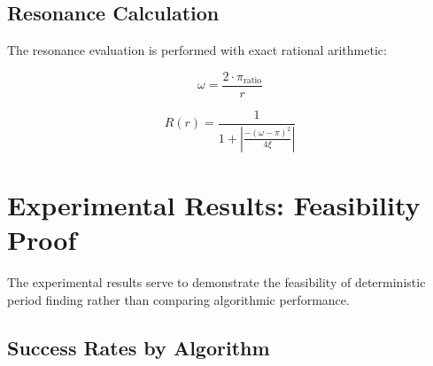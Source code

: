 	\begin{table}[H]
		\centering
		\caption{$\xi$-Strategies in the T0-Framework}
		\label{tab:xi_strategies}
	\end{table}
	
	\subsection{Resonance Calculation}
	
	The resonance evaluation is performed with exact rational arithmetic:
	
	\begin{equation}
		\omega = \frac{2 \cdot \pi_{\text{ratio}}}{r}
	\end{equation}
	
	\begin{equation}
		R(r) = \frac{1}{1 + \left|\frac{-(\omega-\pi)^2}{4\xi}\right|}
	\end{equation}
	
	\section{Experimental Results: Feasibility Proof}
	
	The experimental results serve to demonstrate the feasibility of deterministic period finding rather than comparing algorithmic performance.
	
	\subsection{Success Rates by Algorithm}
	
	\begin{table}[H]
		\centering
		\caption{Overall Success Rates of All Algorithms}
		\label{tab:success_rates}
	\end{table}
	
